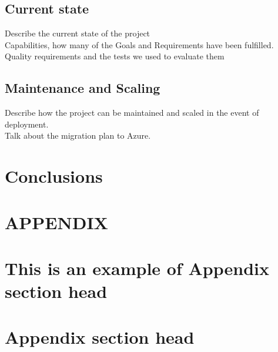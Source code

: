 \documentclass[prodmode,acmtosem]{acmsmall} %
\begin{document}
\subsection{Current state}
Describe the current state of the project\\
Capabilities, how many of the Goals and Requirements have been fulfilled.\\
Quality requirements and the tests we used to evaluate them\\

\subsection{Maintenance and Scaling}
Describe how the project can be maintained and scaled in the event of deployment.\\
Talk about the migration plan to Azure.\\


\section{Conclusions}


\appendix
\section*{APPENDIX} \label{Appendix}
\setcounter{section}{1}


\begin{acks}
\end{acks}  





\elecappendix

\medskip

\section{This is an example of Appendix section head}


\section{Appendix section head}
\end{document}
